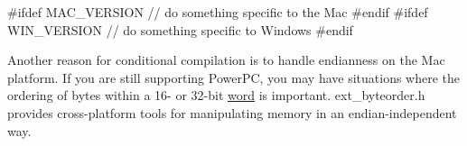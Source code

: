 \begin{DoxyCode}
    #ifdef MAC_VERSION
    // do something specific to the Mac
    #endif
    #ifdef WIN_VERSION
    // do something specific to Windows
    #endif
\end{DoxyCode}


Another reason for conditional compilation is to handle endianness on the Mac platform. If you are still supporting PowerPC, you may have situations where the ordering of bytes within a 16-\/ or 32-\/bit \hyperlink{unionword}{word} is important. ext\_\-byteorder.h provides cross-\/platform tools for manipulating memory in an endian-\/independent way. 